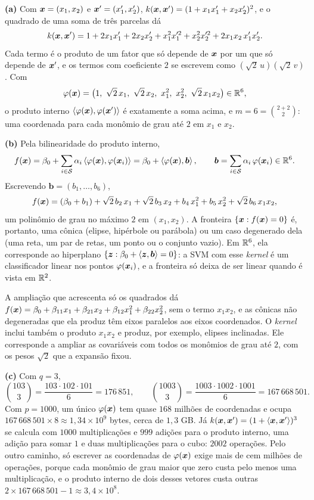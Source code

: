 \documentclass[11pt,a4paper]{article}
\begin{document}
\begin{solucao}
\textbf{(a)} Com $\bm{x}=(x_1,x_2)$ e $\bm{x}'=(x_1',x_2')$,
$k(\bm{x},\bm{x}')=(1+x_1x_1'+x_2x_2')^2$, e o quadrado de uma soma de três parcelas dá
\[
  k(\bm{x},\bm{x}')=1+2x_1x_1'+2x_2x_2'+x_1^2x_1'^2+x_2^2x_2'^2+2x_1x_2\,x_1'x_2' .
\]
Cada termo é o produto de um fator que só depende de $\bm{x}$ por um que só depende de
$\bm{x}'$, e os termos com coeficiente $2$ se escrevem como $(\sqrt2\,u)(\sqrt2\,v)$. Com
\[
  \varphi(\x)=\big(1,\ \sqrt2\,x_1,\ \sqrt2\,x_2,\ x_1^2,\ x_2^2,\ \sqrt2\,x_1x_2\big)
  \in\R^6,
\]
o produto interno $\left\langle \varphi(\bm{x}), \varphi(\bm{x}') \right\rangle$ é exatamente a soma acima, e
$m=6=\binom{2+2}{2}$: uma coordenada para cada monômio de grau até $2$ em $x_1$ e
$x_2$.

\smallskip
\textbf{(b)} Pela bilinearidade do produto interno,
\[
  f(\bm{x})=\beta_0+\sum_{i\in\mathcal S}\alpha_i\left\langle \varphi(\bm{x}), \varphi(\bm{x}_i) \right\rangle
  =\beta_0+\left\langle \varphi(\bm{x}), \bm b \right\rangle,
  \qquad \bm b=\sum_{i\in\mathcal S}\alpha_i\,\varphi(\bm{x}_i)\in\mathbb{R}^6 .
\]
Escrevendo $\bm b=(b_1,\dots,b_6)$,
\[
  f(\bm{x})=(\beta_0+b_1)+\sqrt2\,b_2\,x_1+\sqrt2\,b_3\,x_2+b_4\,x_1^2+b_5\,x_2^2
        +\sqrt2\,b_6\,x_1x_2 ,
\]
um polinômio de grau no máximo $2$ em $(x_1,x_2)$. A fronteira $\{\bm{x}: f(\bm{x})=0\}$ é,
portanto, uma cônica (elipse, hipérbole ou parábola) ou um caso degenerado dela (uma
reta, um par de retas, um ponto ou o conjunto vazio). Em $\mathbb{R}^6$, ela corresponde ao
hiperplano $\{\bm z:\beta_0+\left\langle \bm z, \bm b \right\rangle=0\}$: a SVM com esse \emph{kernel} é
um classificador linear nos pontos $\varphi(\bm{x}_i)$, e a fronteira só deixa de ser
linear quando é vista em $\mathbb{R}^2$.

A ampliação que acrescenta só os quadrados dá
$f(\bm{x})=\beta_0+\beta_{11}x_1+\beta_{21}x_2+\beta_{12}x_1^2+\beta_{22}x_2^2$, sem o termo
$x_1x_2$, e as cônicas não degeneradas que ela produz têm eixos paralelos aos eixos
coordenados. O \emph{kernel} inclui também o produto $x_1x_2$ e produz, por exemplo,
elipses inclinadas. Ele corresponde a ampliar as covariáveis com todos os monômios de
grau até $2$, com os pesos $\sqrt2$ que a expansão fixou.

\smallskip
\textbf{(c)} Com $q=3$,
\[
  \binom{103}{3}=\frac{103\cdot102\cdot101}{6}=176\,851,
  \qquad
  \binom{1003}{3}=\frac{1003\cdot1002\cdot1001}{6}=167\,668\,501 .
\]
Com $p=1000$, um único $\varphi(\bm{x})$ tem quase $168$ milhões de coordenadas e ocupa
$167\,668\,501\times8\approx1{,}34\times10^9$ bytes, cerca de $1{,}3$ GB. Já
$k(\bm{x},\bm{x}')=(1+\left\langle \bm{x}, \bm{x}' \right\rangle)^3$ se calcula com $1000$ multiplicações e $999$ adições
para o produto interno, uma adição para somar $1$ e duas multiplicações para o cubo:
$2002$ operações. Pelo outro caminho, só escrever as coordenadas de $\varphi(\bm{x})$
exige mais de cem milhões de operações, porque cada monômio de grau maior que zero
custa pelo menos uma multiplicação, e o produto interno de dois desses vetores custa
outras $2\times167\,668\,501-1\approx3{,}4\times10^8$.


\end{solucao}
\end{document}
